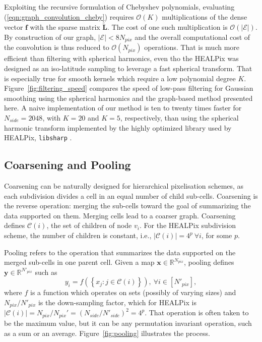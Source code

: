 \documentclass[final,twocolumn,3p,times,authoryear]{elsarticle}
\newcommand{\figref}[1]{Figure~\ref{fig:#1}}
\newcommand{\eqnref}[1]{(\ref{eqn:#1})}
\renewcommand{\b}[1]{{\bm{#1}}}   %
\newcommand{\1}{\b{1}}              %
\newcommand{\0}{\b{0}}              %
\newcommand{\E}{\mathcal{E}}
\newcommand{\C}{\mathcal{C}}
\renewcommand{\L}{\b{L}}
\newcommand{\tL}{\tilde{\L}}
\newcommand{\x}{\b{x}}
\newcommand{\y}{\b{y}}
\newcommand{\f}{\b{f}}
\newcommand{\R}{\mathbb{R}}
\newcommand{\bO}{\mathcal{O}}
\newcommand{\pkg}[1]{\texttt{#1}}
\begin{document}
Exploiting the recursive formulation of Chebyshev polynomials, evaluating \eqnref{graph_convolution_cheby} requires $\bO(K)$ multiplications of the dense vector $\f$ with the sparse matrix $\tL$.
The cost of one such multiplication is $\bO(|\E|)$. By construction of our graph, $|\E| < 8 N_{pix}$ and the overall computational cost of the convolution is thus reduced to $\bO(N_{pix})$ operations.
That is much more efficient than filtering with spherical harmonics, even tho the HEALPix was designed as an iso-latitude sampling to leverage a fast spherical transform.
That is especially true for smooth kernels which require a low polynomial degree $K$.
\figref{filtering_speed} compares the speed of low-pass filtering for Gaussian smoothing using the spherical harmonics and the graph-based method presented here.
A naive implementation of our method is ten to twenty times faster for $N_{side} = 2048$, with $K=20$ and $K=5$, respectively, than using the spherical harmonic transform implemented by the highly optimized library used by HEALPix, \pkg{libsharp} \citep{reinecke2013libsharp}.

\subsection{Coarsening and Pooling}

Coarsening can be naturally designed for hierarchical pixelisation schemes, as each subdivision divides a cell in an equal number of child sub-cells.
Coarsening is the reverse operation: merging the sub-cells toward the goal of summarizing the data supported on them.
Merging cells lead to a coarser graph.
Coarsening defines $\C(i)$, the set of children of node $v_i$.
For the HEALPix subdivision scheme, the number of children is constant, i.e., $| \C(i) | = 4^p \ \forall i$, for some $p$.

Pooling refers to the operation that summarizes the data supported on the merged sub-cells in one parent cell.
Given a map $\x \in \R^{N_{pix}}$, pooling defines $\y \in \R^{N'_{pix}}$ such as
\begin{equation} \label{eqn:pooling}
	y_i = f \left( \left\{ x_j : j \in \C(i) \right\} \right), \ \forall i \in [N'_{pix}],
\end{equation}
where $f$ is a function which operates on sets (possibly of varying sizes) and $N_{pix} / {N'_{pix}}$ is the down-sampling factor, which for HEALPix is $| \C(i) | = N_{pix} / {N_{pix}}' = (N_{side} / N'_{side})^2 = 4^p$.
That operation is often taken to be the maximum value, but it can be any permutation invariant operation, such as a sum or an average.
\figref{pooling} illustrates the process.
\end{document}
